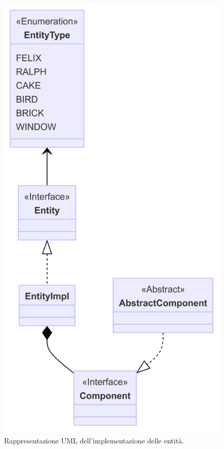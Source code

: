 \documentclass[a4paper,12pt]{report}
\begin{document}
\begin{figure}[H]
\centering{}
\includegraphics[width=\textwidth]{img/entities.png}
\caption{Rappresentazione UML dell'implementazione delle entità.}
\end{figure}
\end{document}
